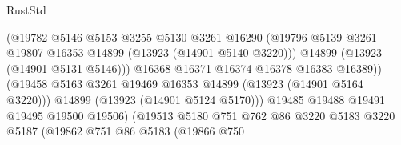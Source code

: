 \begin{lexlean}{RustStd}
\begin{coremodule}
                                            (@19782
                                              @5146
                                              @5153
                                              @3255
                                              @5130
                                              @3261
                                              @16290
                                              (@19796
                                                @5139
                                                @3261
                                                @19807
                                                @16353
                                                @14899
                                                (@13923 (@14901 @5140 @3220)))
                                              @14899
                                              (@13923 (@14901 @5131 @5146)))
                                            @16368
                                            @16371
                                            @16374
                                            @16378
                                            @16383
                                            @16389))
                                        (@19458
                                          @5163
                                          @3261
                                          @19469
                                          @16353
                                          @14899
                                          (@13923 (@14901 @5164 @3220)))
                                        @14899
                                        (@13923 (@14901 @5124 @5170)))
                                      @19485
                                      @19488
                                      @19491
                                      @19495
                                      @19500
                                      @19506)
                                    (@19513
                                      @5180
                                      @751
                                      @762
                                      @86
                                      @3220
                                      @5183
                                      @3220
                                      @5187
                                      (@19862
                                        @751
                                        @86
                                        @5183
                                        (@19866
                                          @750

\end{coremodule}
\end{lexlean}
